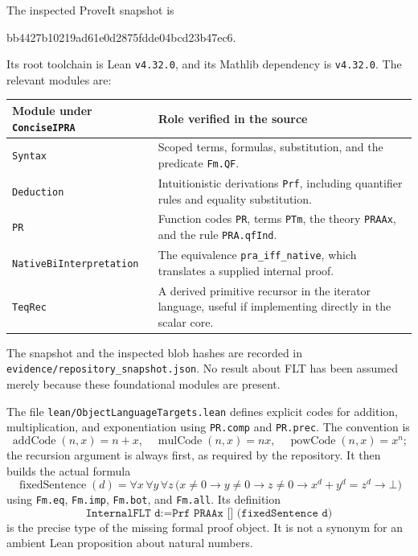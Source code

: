The inspected ProveIt snapshot is
\begin{center}\small\ttfamily
bb4427b10219ad61e0d2875fdde04bcd23b47ec6.
\end{center}
Its root toolchain is Lean \texttt{v4.32.0}, and its Mathlib dependency is
\texttt{v4.32.0}. The relevant modules are:
\begin{center}
\begin{tabular}{>{\raggedright\arraybackslash}p{}>{\raggedright\arraybackslash}p{}}
\toprule
Module under \texttt{ConciseIPRA} & Role verified in the source\\
\midrule
\texttt{Syntax} & Scoped terms, formulas, substitution, and the predicate
\texttt{Fm.QF}.\\
\texttt{Deduction} & Intuitionistic derivations \texttt{Prf}, including
quantifier rules and equality substitution.\\
\texttt{PR} & Function codes \texttt{PR}, terms \texttt{PTm}, the theory
\texttt{PRAAx}, and the rule \texttt{PRA.qfInd}.\\
\texttt{NativeBiInterpretation} & The equivalence
\texttt{pra\_iff\_native}, which translates a supplied internal proof.\\
\texttt{TeqRec} & A derived primitive recursor in the iterator language,
useful if implementing directly in the scalar core.\\
\bottomrule
\end{tabular}
\end{center}
The snapshot and the inspected blob hashes are recorded in
\texttt{evidence/repository\_snapshot.json}. No result about FLT has been
assumed merely because these foundational modules are present.

The file \texttt{lean/ObjectLanguageTargets.lean} defines explicit codes
for addition, multiplication, and exponentiation using
\texttt{PR.comp} and \texttt{PR.prec}. The convention is
\[
 \operatorname{addCode}(n,x)=n+x,\quad
 \operatorname{mulCode}(n,x)=nx,\quad
 \operatorname{powCode}(n,x)=x^n;
\]
the recursion argument is always first, as required by the repository.
It then builds the actual formula
\[
 \operatorname{fixedSentence}(d)=
 \forall x\,\forall y\,\forall z\,
 \bigl(x\ne0\to y\ne0\to z\ne0\to
            x^d+y^d=z^d\to\bot\bigr)
\]
using \texttt{Fm.eq}, \texttt{Fm.imp}, \texttt{Fm.bot}, and
\texttt{Fm.all}. Its definition
\[
 \texttt{InternalFLT d}
 :=\texttt{Prf PRAAx [] (fixedSentence d)}
\]
is the precise type of the missing formal proof object. It is not a
synonym for an ambient Lean proposition about natural numbers.

